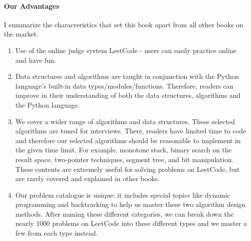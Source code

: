 \documentclass[12pt]{article}
\begin{document}
\paragraph{Our Advantages}  I summarize the characreristics that set this book apart from all other books on the market.
\begin{enumerate}
    \item Use of the online judge system LeetCode - users can easily practice online and have fun.
    \item Data structures and algorithms are taught in conjunction with the Python language's built-in data types/modules/functions. Therefore, readers can improve in their understanding of both the data structures, algorithms and the Python language.
    \item We cover a wider range of algorithms and data structures. These selected algorithms are tuned for interviews. There, readers have limited time to code and therefore our selected algorithms should be reasonable to implement in the given time limit. For example, monotone stack, binary search on the result space, two-pointer techniques, segment tree, and bit manipulation. These contents are extremely useful for solving problems on LeetCode, but are rarely covered and explained in other books.
    \item Our problem catalogue is unique: it includes special topics like dynamic programming and backtracking to help us master these two algorithm design methods. After naming these different categories, we can break down the nearly 1000 problems on LeetCode into these different types and we master a few from each type instead. 
\end{enumerate}

\end{document}
